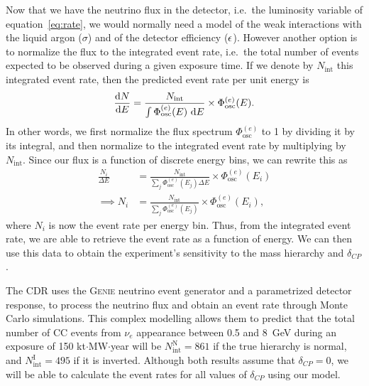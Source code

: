 Now that we have the neutrino flux in the detector, i.e.~the luminosity
variable of equation~\ref{eq:rate}, we would normally need a model of the weak
interactions with the liquid argon ($\sigma$) and of the detector efficiency
($\epsilon$).
However another option is to normalize the flux to the integrated event rate,
i.e.~the total number of events expected to be observed during a given exposure
time. If we denote by $N_\text{int}$ this integrated event rate, then the
predicted event rate per unit energy is
\begin{equation}
	\frac{\mathrm{d} N}{\mathrm{d} E} = \frac{N_\text{int}}{\int \Phi^{(e)}_\text{osc} (E)~\mathrm{d} E}
	\times \Phi^{(e)}_\text{osc} (E).
\end{equation}
In other words, we first normalize the flux spectrum $\Phi^{(e)}_\text{osc}$ to
1 by dividing it by its integral, and then normalize to the integrated event
rate by multiplying by $N_\text{int}$.
Since our flux is a function of discrete energy bins, we can rewrite this as
\begin{align}
	\frac{N_i}{\Delta E} &= \frac{N_\text{int}}{\sum\limits_j \Phi^{(e)}_\text{osc} (E_j)
	\Delta E} \times \Phi^{(e)}_\text{osc} (E_i)\nonumber\\\implies
	N_i &= \frac{N_\text{int}}{\sum\limits_j \Phi^{(e)}_\text{osc} (E_j)} \times
	\Phi^{(e)}_\text{osc} (E_i),\label{eq:event_rate_0}
\end{align}
where $N_i$ is now the event rate per energy bin.
Thus, from the integrated event rate, we are able to retrieve the event rate as
a function of energy. We can then use this data to obtain the experiment's
sensitivity to the mass hierarchy and $\delta_{CP}$.

The CDR uses the \textsc{Genie}\cite{GENIE} neutrino event generator and a
parametrized detector response, to process the neutrino flux and
obtain an event rate through Monte Carlo simulations. This complex modelling
allows them to predict that the total number of CC events from $\nu_e$
appearance between 0.5 and \SI{8}{\GeV} during an exposure of 150
kt$\cdot$MW$\cdot$year will be $N^\text{N}_\text{int}=861$ if the true
hierarchy is normal, and $N^\text{I}_\text{int}=495$ if it is inverted.
Although both results assume that $\delta_{CP}=0$, we will be able to calculate
the event rates for all values of $\delta_{CP}$ using our model.

